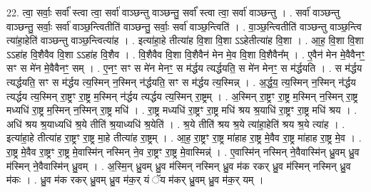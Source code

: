 \documentclass[17pt]{extarticle}
\begin{document}
22. त्वा॒ सर्वाः॒ सर्वा᳚ स्त्वा त्वा॒ सर्वा॑ वाञ्छन्तु वाञ्छन्तु॒ सर्वा᳚ स्त्वा त्वा॒ सर्वा॑ वाञ्छन्तु । . सर्वा॑ वाञ्छन्तु वाञ्छन्तु॒ सर्वाः॒ सर्वा॑ वाञ्छ॒न्त्वितीति॑ वाञ्छन्तु॒ सर्वाः॒ सर्वा॑ वाञ्छ॒न्त्विति॑ । . वा॒ञ्छ॒न्त्वितीति॑ वाञ्छन्तु वाञ्छ॒न्त्वि त्या॑हा॒हेति॑ वाञ्छन्तु वाञ्छ॒न्त्वित्या॑ह । . इत्या॑हा॒हे तीत्या॑ह वि॒शा वि॒शा ऽऽहेतीत्या॑ह वि॒शा । . आ॒ह॒ वि॒शा वि॒शा ऽऽहा॑ह वि॒शैवैव वि॒शा ऽऽहा॑ह वि॒शैव । . वि॒शैवैव वि॒शा वि॒शैवैन॑ मेन मे॒व वि॒शा वि॒शैवैन᳚म् । . ए॒वैन॑ मेन मे॒वैवैनꣳ॒॒ सꣳ स मे॑न मे॒वैवैनꣳ॒॒ सम् । . ए॒नꣳ॒॒ सꣳ स मे॑न मेनꣳ॒॒ स म॑र्द्धय त्यर्द्धयति॒ स मे॑न मेनꣳ॒॒ स म॑र्द्धयति । . स म॑र्द्धय त्यर्द्धयति॒ सꣳ स म॑र्द्धय त्य॒स्मिन् न॒स्मिन् न॑र्द्धयति॒ सꣳ स म॑र्द्धय त्य॒स्मिन्न् । . अ॒र्द्ध॒य॒ त्य॒स्मिन् न॒स्मिन् न॑र्द्धय त्यर्द्धय त्य॒स्मिन् रा॒ष्ट्रꣳ रा॒ष्ट्र म॒स्मिन् न॑र्द्धय त्यर्द्धय त्य॒स्मिन् रा॒ष्ट्रम् । . अ॒स्मिन् रा॒ष्ट्रꣳ रा॒ष्ट्र म॒स्मिन् न॒स्मिन् रा॒ष्ट्र मध्यधि॑ रा॒ष्ट्र म॒स्मिन् न॒स्मिन् रा॒ष्ट्र मधि॑ । . रा॒ष्ट्र मध्यधि॑ रा॒ष्ट्रꣳ रा॒ष्ट्र मधि॑ श्रय श्र॒याधि॑ रा॒ष्ट्रꣳ रा॒ष्ट्र मधि॑ श्रय । . अधि॑ श्रय श्र॒याध्यधि॑ श्र॒ये तीति॑ श्र॒याध्यधि॑ श्र॒येति॑ । . श्र॒ये तीति॑ श्रय श्र॒ये त्या॑हा॒हेति॑ श्रय श्र॒ये त्या॑ह । . इत्या॑हा॒हे तीत्या॑ह रा॒ष्ट्रꣳ रा॒ष्ट्र मा॒हे तीत्या॑ह रा॒ष्ट्रम् । . आ॒ह॒ रा॒ष्ट्रꣳ रा॒ष्ट्र मा॑हाह रा॒ष्ट्र मे॒वैव रा॒ष्ट्र मा॑हाह रा॒ष्ट्र मे॒व । . रा॒ष्ट्र मे॒वैव रा॒ष्ट्रꣳ रा॒ष्ट्र मे॒वास्मि॑न् नस्मिन् ने॒व रा॒ष्ट्रꣳ रा॒ष्ट्र मे॒वास्मिन्न्॑ । . ए॒वास्मि॑न् नस्मिन् ने॒वैवास्मि॑न् ध्रु॒वम् ध्रु॒व म॑स्मिन् ने॒वैवास्मि॑न् ध्रु॒वम् । . अ॒स्मि॒न् ध्रु॒वम् ध्रु॒व म॑स्मिन् नस्मिन् ध्रु॒व म॑क रकर् ध्रु॒व म॑स्मिन् नस्मिन् ध्रु॒व म॑कः । . ध्रु॒व म॑क रकर् ध्रु॒वम् ध्रु॒व म॑क॒र् यं ॅय म॑कर् ध्रु॒वम् ध्रु॒व म॑क॒र् यम् । \newline
\end{document}
